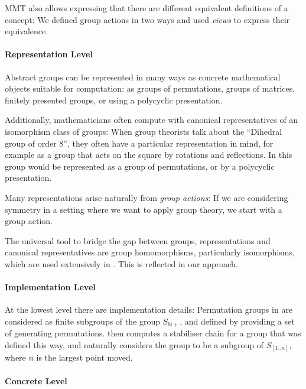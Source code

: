 MMT also allows expressing that there are different equivalent definitions of a
concept: We defined group actions in two ways and used \emph{views} to express
their equivalence.

\paragraph{Representation Level} 
Abstract groups can be represented in many ways as concrete mathematical
objects suitable for computation: as groups of permutations, groups of matrices,
finitely presented groups, or using a polycyclic presentation.

Additionally, mathematicians often compute with canonical representatives of an isomorphism class of groups: When group theorists talk about the ``Dihedral group of order 8'', they often have a particular representation in mind, for example as a group that acts on the square by rotations and reflections. 
In \GAP this group would be represented as a group of permutations, or by a polycyclic presentation.

Many representations arise naturally from \emph{group actions}: If we are
considering symmetry in a setting where we want to apply group theory, we start
with a group action.

The universal tool to bridge the gap between groups, representations and
canonical representatives are group homomorphisms, particularly isomorphisms,
which are used extensively in \GAP. This is reflected in our approach.

\paragraph{Implementation Level}
At the lowest level there are implementation details: Permutation groups in \GAP
are considered as finite subgroups of the group $S_{\mathbb{N}+}$, and defined by
providing a set of generating permutations. \GAP then computes a stabiliser chain
for a group that was defined this way, and naturally considers the group to be a
subgroup of $S_{[1..n]}$, where $n$ is the largest point moved.

\paragraph{Concrete Level}

